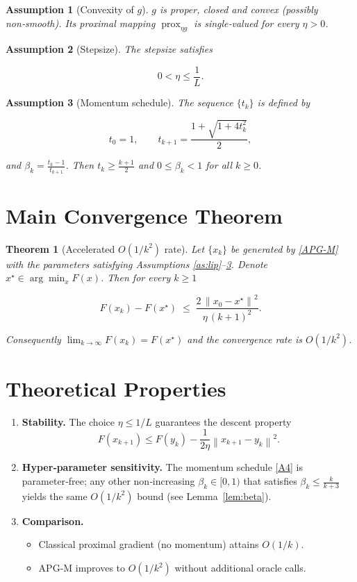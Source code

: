 \documentclass{article}
\newtheorem{theorem}{Theorem}
\newtheorem{assumption}{Assumption}
\newcommand{\prox}{\operatorname{prox}}
\newcommand{\norm}[1]{\left\lVert#1\right\rVert}
\begin{document}
\begin{assumption}[Convexity of $g$]\label{as:convex}
$g$ is proper, closed and convex (possibly non‑smooth).  
Its proximal mapping $\prox_{\eta g}$ is single‑valued for every $\eta>0$.
\end{assumption}

\begin{assumption}[Stepsize]\label{as:stepsize}
The stepsize satisfies  

\[
0<\eta\le \frac{1}{L}.
\tag{A3}
\]
\end{assumption}

\begin{assumption}[Momentum schedule]\label{as:momentum}
The sequence $\{t_k\}$ is defined by  

\[
t_{0}=1,\qquad 
t_{k+1}= \frac{1+\sqrt{1+4t_{k}^{2}}}{2},
\]

and $\beta_k=\frac{t_{k}-1}{t_{k+1}}$.  
Then $t_k\ge \frac{k+1}{2}$ and $0\le\beta_k<1$ for all $k\ge0$.
\end{assumption}

\section*{Main Convergence Theorem}
\begin{theorem}[Accelerated $O(1/k^{2})$ rate]\label{thm:rate}
Let $\{x_k\}$ be generated by \eqref{APG-M} with the parameters satisfying Assumptions \ref{as:lip}–\ref{as:momentum}.  
Denote $x^{\star}\in\arg\min_{x}F(x)$. Then for every $k\ge 1$  

\[
F(x_k)-F(x^{\star})\;\le\;
\frac{2\,\norm{x_{0}-x^{\star}}^{2}}{\eta \, (k+1)^{2}} .
\tag{1}
\]

Consequently $\displaystyle \lim_{k\to\infty}F(x_k)=F(x^{\star})$ and the convergence
rate is $O(1/k^{2})$.
\end{theorem}

\section*{Theoretical Properties}
\begin{enumerate}[label=\arabic*.]
\item \textbf{Stability.} The choice $\eta\le 1/L$ guarantees the descent property
\[
F(x_{k+1})\le F(y_k)-\frac{1}{2\eta}\norm{x_{k+1}-y_k}^{2}.
\tag{P1}
\]
\item \textbf{Hyper‑parameter sensitivity.} The momentum schedule \eqref{A4} is
parameter‑free; any other non‑increasing $\beta_k\in[0,1)$ that satisfies
$\beta_k\le \frac{k}{k+3}$ yields the same $O(1/k^{2})$ bound (see Lemma~\ref{lem:beta}).
\item \textbf{Comparison.} 
\begin{itemize}
  \item Classical proximal gradient (no momentum) attains $O(1/k)$.
  \item APG‑M improves to $O(1/k^{2})$ without additional oracle calls.
\end{itemize}
\end{enumerate}
\end{document}
